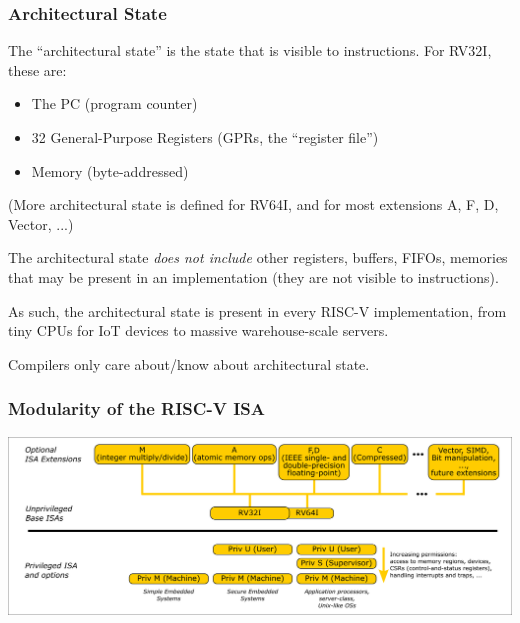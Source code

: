 \begin{frame}
\frametitle{Architectural State}

The ``architectural state'' is the state that is visible to
instructions.  For RV32I, these are:

{\footnotesize
  \begin{itemize}
  \item The PC (program counter)
  \item 32 General-Purpose Registers (GPRs, the ``register file'')
  \item Memory (byte-addressed)
  \end{itemize}}

{\footnotesize (More architectural state is defined for RV64I, and for
  most extensions A, F, D, Vector, ...)}

\vspace{1ex}

The architectural state \emph{does not include} other registers,
buffers, FIFOs, memories that may be present in an implementation
(they are not visible to instructions).

As such, the architectural state is present in every RISC-V
implementation, from tiny CPUs for IoT devices to massive
warehouse-scale servers.

Compilers only care about/know about architectural state.

\end{frame}


\begin{frame}
\frametitle{Modularity of the RISC-V ISA}

\begin{center}
\includegraphics[height=0.6\textheight]{../Figures/Fig_ISA_Modularity}
\end{center}

\end{frame}


